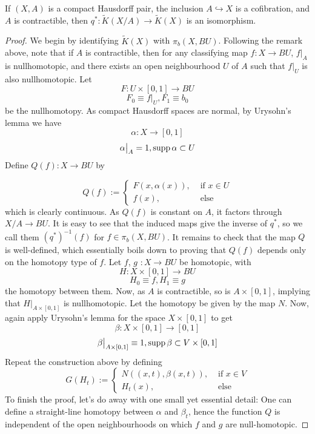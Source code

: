 \documentclass[11pt,a4paper]{article}
\begin{document}
\begin{proposition}
If $(X,A)$ is a compact Hausdorff pair, the inclusion $A\hookrightarrow X$ is a cofibration, and $A$ is contractible, then $q^*: \widetilde{K}(X/A) \rightarrow \widetilde{K}(X)$ is an isomorphism.
\end{proposition}

\begin{proof}
    We begin by identifying $\widetilde{K}(X)$ with $\pi_b(X,BU)$. Following the remark above, note that if $A$ is contractible, then for any classifying map $f: X\rightarrow BU$, $f\big|_A$ is nullhomotopic, and there exists an open neighbourhood $U$ of $A$ such that $f\big|_U$ is also nullhomotopic. Let
    $$F:U\times [0,1] \rightarrow BU$$
    $$F_0\equiv f\big|_U, F_1 \equiv b_0$$ be the nullhomotopy. As compact Hausdorff spaces are normal, by Urysohn's lemma we have $$\alpha :X \rightarrow [0,1]$$
    $$\alpha\big|_A = 1, \operatorname{supp}{\alpha} \subset U$$
    Define $Q(f): X \rightarrow BU$ by

        \begin{equation*}
            Q(f) :=
            \begin{cases}
                F(x,\alpha(x)),& \text{ if } x\in U\\
            f(x), & \text{ else}
            \end{cases}
        \end{equation*}
        which is clearly continuous. As $Q(f)$ is constant on $A$, it factors through $X/A \rightarrow BU$. It is easy to see that the induced maps give the inverse of $q^*$, so we call them $(q^*)^{-1}(f)$ for $f\in \pi_b(X, BU)$. It remains to check that the map $Q$ is well-defined, which essentially boils down to proving that $Q(f)$ depends only on the homotopy type of $f$. Let $f$, $g$ $:X \rightarrow BU$ be homotopic, with
        $$H: X\times [0,1] \rightarrow BU$$
        $$H_0 \equiv f, H_1 \equiv g$$
        the homotopy between them. Now, as $A$ is contractible, so is $A\times [0,1]$, implying that $H\big|_{A\times [0,1]}$ is nullhomotopic. Let the homotopy be given by the map $N$. Now, again apply Urysohn's lemma for the space $X\times [0,1]$ to get
        $$\beta: X\times [0,1] \rightarrow [0,1]$$
        $$\beta\big|_{A\times [0,1]} \equiv 1, \operatorname{supp}{\beta} \subset V\times [0,1]$$
        Repeat the construction above by defining
        $$G(H_t):= \begin{cases}
            N((x, t), \beta(x,t)), & \text{ if } x\in V\\
            H_t(x), & \text{ else}
        \end{cases}$$
        To finish the proof, let's do away with one small yet essential detail: One can define a straight-line homotopy between $\alpha$ and $\beta_t$, hence the function $Q$ is independent of the open neighbourhoods on which $f$ and $g$ are null-homotopic.
\end{proof}
\end{document}

